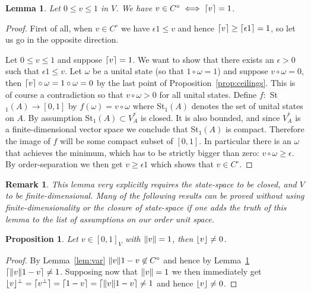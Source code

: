 \documentclass[a4paper,onecolumn,10pt,accepted=2019-05-03, issue=1, volume=1, shorttitle=papers/compositionality-1-1]{compositionalityarticle}
\DeclarePairedDelimiter{\ceil}{\lceil}{\rceil}
\DeclarePairedDelimiter{\floor}{\lfloor}{\rfloor}
\newcounter{counter}
\numberwithin{counter}{section}
\newtheorem{proposition}[counter]{Proposition}
\newtheorem{lemma}[counter]{Lemma}
\newtheorem{remark}[counter]{Remark}
\begin{document}
\begin{lemma}\label{lem:finitedimrank}
    Let $0\leq v\leq 1$ in $V$. We have $v\in C^\circ \iff \ceil{v}=1$.
\end{lemma}
\begin{proof}
    First of all, when $v\in C^\circ$ we have $\epsilon 1\leq v$ and hence $\ceil{v}\geq \ceil{\epsilon 1} = 1$, so let us go in the opposite direction.

    Let $0\leq v\leq 1$ and suppose $\ceil{v}=1$. We want to show that there exists an $\epsilon>0$ such that $\epsilon 1\leq v$. Let $\omega$ be a unital state (so that $1\circ \omega = 1$) and suppose $v\circ \omega = 0$, then $\ceil{v}\circ\omega = 1\circ\omega = 0$ by the last point of Proposition~\ref{prop:ceilings}. This is of course a contradiction so that $v\circ \omega>0$ for all unital states. Define $f:$ St$_1(A)\rightarrow [0,1]$ by $f(\omega)=v\circ \omega$ where St$_1(A)$ denotes the set of unital states on $A$. By assumption St$_1(A)\subset V_A^*$ is closed. It is also bounded, and since $V_A^*$ is a finite-dimensional vector space we conclude that St$_1(A)$ is compact. Therefore the image of $f$ will be some compact subset of $[0,1]$. In particular there is an $\omega$ that achieves the minimum, which has to be strictly bigger than zero: $v\circ\omega \geq \epsilon$. By order-separation we then get $v\geq \epsilon 1$ which shows that $v\in C^\circ$.
\end{proof}

\begin{remark}
    This lemma very explicitly requires the state-space to be closed, and $V$ to be finite-dimensional. Many of the following results can be proved without using finite-dimensionality or the closure of state-space if one adds the truth of this lemma to the list of assumptions on our order unit space.
\end{remark}

\begin{proposition} \label{prop:ceilint}
    Let $v\in [0,1]_V$ with $\norm{v}=1$, then $\floor{v}\neq 0$.
\end{proposition}
\begin{proof}
	By Lemma~\ref{lem:var} $\norm{v}1-v \not\in C^\circ$ and hence by Lemma~\ref{lem:finitedimrank} $\ceil{\norm{v}1-v} \neq 1$. Supposing now that $\norm{v}=1$ we then immediately get $\floor{v}^\perp = \ceil{v^\perp} = \ceil{1-v} = \ceil{\norm{v}1 -v} \neq 1$ and hence $\floor{v}\neq 0$.
\end{proof}
\end{document}
